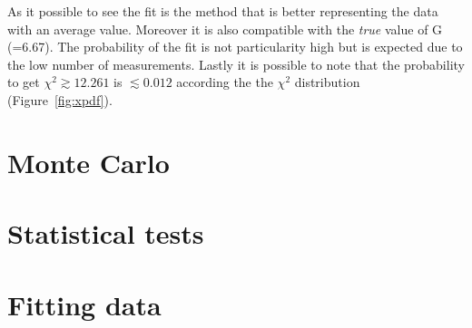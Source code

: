 \documentclass[twocolumn]{article}
\begin{document}
	As it possible to see the fit is the method that is better representing the data with an average value.
	Moreover it is also compatible with the \emph{true} value of G (=6.67).
	The probability of the fit is not particularity high but is expected due to the low number of measurements.
	Lastly it is possible to note that the probability to get $\chi ^2 \gtrsim 12.261 $ is $ \lesssim 0.012$ according the the $\chi ^2$ distribution (Figure~\ref{fig:xpdf}).
\subsection{} %
	\label{sub:}


\section{Monte Carlo} %
\label{sec:monte_carlo}


\section{Statistical tests} %
\label{sec:statistical_tests}



\section{Fitting data} %
\label{sec:fitting_data}

\end{document}
